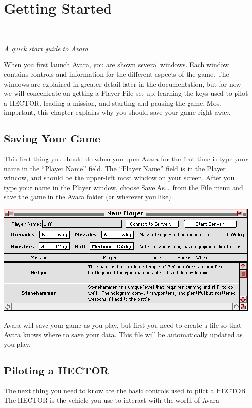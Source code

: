 \documentclass{article}
\let\oldsection\section
\renewcommand\section{\clearpage\oldsection}
\begin{document}
\section{Getting Started}
\rule{5.5cm}{.15pt}\\
\rmfamily\textit{A quick start guide to Avara}

When you first launch Avara, you are shown several windows. Each window contains controls and information for the different aspects of the game. The windows are explained in greater detail later in the documentation, but for now we will concentrate on getting a Player File set up, learning the keys used to pilot a HECTOR, loading a mission, and starting and pausing the game. Most important, this chapter explains why you should save your game right away.

\subsection{Saving Your Game}
This first thing you should do when you open Avara for the first time is type your name in the ``Player Name'' field. The ``Player Name'' field is in the Player window, and should be the upper-left most window on your screen. After you type your name in the Player window, choose Save As\dots\ from the File menu and save the game in the Avara folder (or wherever you like).

\begin{center}
	\includegraphics[width=\textwidth]{img/04.png}
\end{center}

Avara will save your game as you play, but first you need to create a file so that Avara knows where to save your data. This file will be automatically updated as you play.

\subsection{Piloting a HECTOR}
The next thing you need to know are the basic controls used to pilot a HECTOR. The HECTOR is the vehicle you use to interact with the world of Avara.
\end{document}
